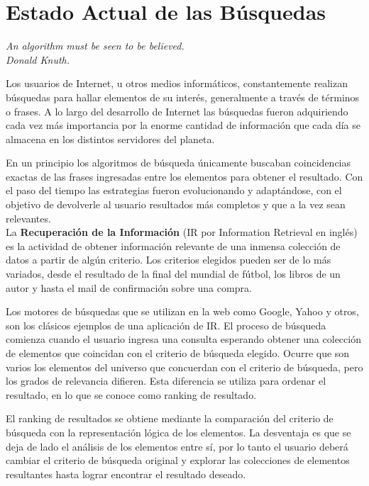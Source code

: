 \section{Estado Actual de las Búsquedas}
{\begin{small}%
\begin{flushright}%
\it An algorithm must be seen to be believed.\\Donald Knuth.
\end{flushright}%
\end{small}%
\vspace{.5cm}}
Los usuarios de Internet, u otros medios informáticos, constantemente realizan búsquedas para hallar elementos de su interés, generalmente a través de términos o frases. A lo largo del desarrollo de Internet las búsquedas fueron adquiriendo cada vez más importancia por la enorme cantidad de información que cada día se almacena en los distintos servidores del planeta.

En un principio los algoritmos de búsqueda únicamente buscaban coincidencias exactas de las frases ingresadas entre los elementos para obtener el resultado. Con el paso del tiempo las estrategias fueron evolucionando y adaptándose, con el objetivo de devolverle al usuario resultados más completos y que a la vez sean relevantes.\\
La \textbf{Recuperación de la Información} (IR por Information Retrieval en inglés) es la actividad de obtener información relevante de una inmensa colección de datos a partir de algún criterio. Los criterios elegidos pueden ser de lo más variados, desde el resultado de la final del mundial de fútbol, los libros de un autor y hasta el mail de confirmación sobre una compra.

Los motores de búsquedas que se utilizan en la web como Google, Yahoo y otros, son los clásicos ejemplos de una aplicación de IR. El proceso de búsqueda comienza cuando el usuario ingresa una consulta esperando obtener una colección de elementos que coincidan con el criterio de búsqueda elegido. Ocurre que son varios los elementos del universo que concuerdan con el criterio de búsqueda, pero los grados de relevancia difieren. Esta diferencia se utiliza para ordenar el resultado, en lo que se conoce como ranking de resultado.

El ranking de resultados se obtiene mediante la comparación del criterio de búsqueda con la representación lógica de los elementos. La desventaja es que se deja de lado el análisis de los elementos entre sí, por lo tanto el usuario deberá cambiar el criterio de búsqueda original y explorar las colecciones de elementos resultantes hasta lograr encontrar el resultado deseado.

